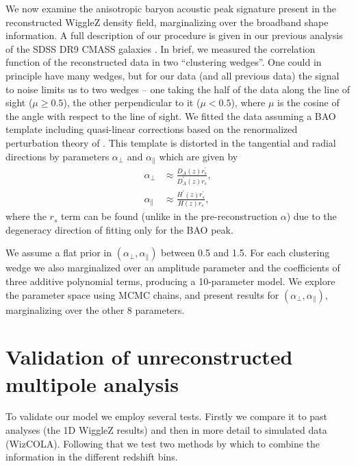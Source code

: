 \documentclass[iop,twocolappendix]{emulateapj}
\begin{document}
We now examine the anisotropic baryon acoustic peak signature present
in the reconstructed WiggleZ density field, marginalizing over the
broadband shape information.  A full description of our procedure is
given in our previous analysis of the SDSS DR9 CMASS galaxies
\citet[][see \S 5.3]{KazinSanchezCuesta2013}.  In brief, we measured the
correlation function of the reconstructed data in two ``clustering
wedges''.  One could in principle have many wedges, but for our data (and all previous data) the signal to noise limits us to two wedges -- one taking the half of the data along the line of sight ($\mu\ge0.5$), the other perpendicular to it ($\mu<0.5$), where $\mu$ is the cosine of the angle with respect to the line of sight.
We fitted the data assuming a BAO template including
quasi-linear corrections based on the renormalized perturbation theory
of \citet{CrocceScoccimarro2008}. This template is distorted in the tangential
and radial directions by parameters $\alpha_\perp$ and
$\alpha_\parallel$ which are given by
\begin{align}
\alpha_\perp &\approx \frac{D_A(z) r^\prime_s }{D_A^{\prime}(z) r_s}, \label{eq:alphaperp}\\
\alpha_\parallel &\approx \frac{H^{\prime}(z) r^\prime_s}{H(z) r_s},\label{eq:alphaparallel}
\end{align}
where the $r_s$ term can be found (unlike in the pre-reconstruction $\alpha$) due to the degeneracy direction of fitting only for the BAO peak.

  


We assume a flat prior in $(\alpha_\perp,\alpha_\parallel)$ between
0.5 and 1.5.  For each clustering wedge we also marginalized over an
amplitude parameter and the coefficients of three additive polynomial
terms, producing a 10-parameter model.  We explore the parameter space
using MCMC chains, and present results for
$(\alpha_\perp,\alpha_\parallel)$, marginalizing over the other 8
parameters.


\section{Validation of unreconstructed multipole analysis}
\label{sec:test}

To validate our model we employ several tests.  Firstly we compare it to past analyses (the 1D WiggleZ results) and then in more detail to simulated data (WizCOLA).  Following that we test two methods by which to combine the information in the different redshift bins.
\end{document}
